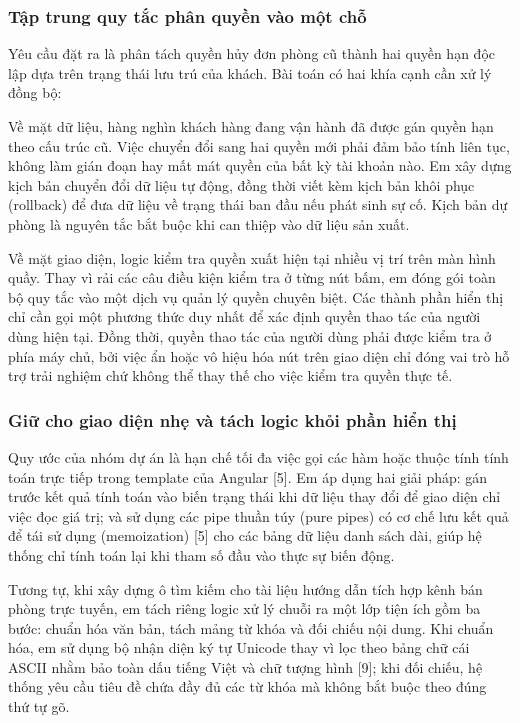 \subsubsection{Tập trung quy tắc phân quyền vào một chỗ}

Yêu cầu đặt ra là phân tách quyền hủy đơn phòng cũ thành hai quyền hạn độc lập dựa trên trạng thái lưu trú của khách. Bài toán có hai khía cạnh cần xử lý đồng bộ:

Về mặt dữ liệu, hàng nghìn khách hàng đang vận hành đã được gán quyền hạn theo cấu trúc cũ. Việc chuyển đổi sang hai quyền mới phải đảm bảo tính liên tục, không làm gián đoạn hay mất mát quyền của bất kỳ tài khoản nào. Em xây dựng kịch bản chuyển đổi dữ liệu tự động, đồng thời viết kèm kịch bản khôi phục (rollback) để đưa dữ liệu về trạng thái ban đầu nếu phát sinh sự cố. Kịch bản dự phòng là nguyên tắc bắt buộc khi can thiệp vào dữ liệu sản xuất.

Về mặt giao diện, logic kiểm tra quyền xuất hiện tại nhiều vị trí trên màn hình quầy. Thay vì rải các câu điều kiện kiểm tra ở từng nút bấm, em đóng gói toàn bộ quy tắc vào một dịch vụ quản lý quyền chuyên biệt. Các thành phần hiển thị chỉ cần gọi một phương thức duy nhất để xác định quyền thao tác của người dùng hiện tại. Đồng thời, quyền thao tác của người dùng phải được kiểm tra ở phía máy chủ, bởi việc ẩn hoặc vô hiệu hóa nút trên giao diện chỉ đóng vai trò hỗ trợ trải nghiệm chứ không thể thay thế cho việc kiểm tra quyền thực tế.

\subsubsection{Giữ cho giao diện nhẹ và tách logic khỏi phần hiển thị}

Quy ước của nhóm dự án là hạn chế tối đa việc gọi các hàm hoặc thuộc tính tính toán trực tiếp trong template của Angular [5]. Em áp dụng hai giải pháp: gán trước kết quả tính toán vào biến trạng thái khi dữ liệu thay đổi để giao diện chỉ việc đọc giá trị; và sử dụng các pipe thuần túy (pure pipes) có cơ chế lưu kết quả để tái sử dụng (memoization) [5] cho các bảng dữ liệu danh sách dài, giúp hệ thống chỉ tính toán lại khi tham số đầu vào thực sự biến động.

Tương tự, khi xây dựng ô tìm kiếm cho tài liệu hướng dẫn tích hợp kênh bán phòng trực tuyến, em tách riêng logic xử lý chuỗi ra một lớp tiện ích gồm ba bước: chuẩn hóa văn bản, tách mảng từ khóa và đối chiếu nội dung. Khi chuẩn hóa, em sử dụng bộ nhận diện ký tự Unicode thay vì lọc theo bảng chữ cái ASCII nhằm bảo toàn dấu tiếng Việt và chữ tượng hình [9]; khi đối chiếu, hệ thống yêu cầu tiêu đề chứa đầy đủ các từ khóa mà không bắt buộc theo đúng thứ tự gõ.

